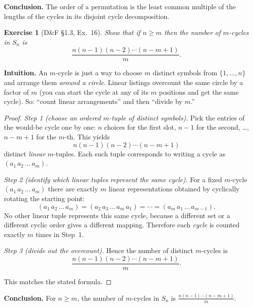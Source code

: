 \documentclass[12pt]{article}
\newtheorem{exercise}[theorem]{Exercise}
\theoremstyle{definition}
\begin{document}
\textbf{Conclusion.} The order of a permutation is the least common multiple of the lengths
of the cycles in its disjoint cycle decomposition. \qedhere


\newpage

\begin{exercise}[D\&F §1.3, Ex.~16]
Show that if $n\ge m$ then the number of $m$-cycles in $S_n$ is
\[
\frac{n(n-1)(n-2)\cdots(n-m+1)}{m}.
\]
\end{exercise}

\dotfill

\noindent\textbf{Intuition.}
An $m$-cycle is just a way to choose $m$ distinct symbols from $\{1,\dots,n\}$ and arrange them
\emph{around a circle}. Linear listings overcount the same circle by a factor of $m$ (you can start the cycle at any of its $m$ positions and get the same cycle). So: “count linear arrangements” and then “divide by $m$.”

\dotfill

\begin{proof}
\emph{Step 1 (choose an ordered $m$-tuple of distinct symbols).}
Pick the entries of the would-be cycle one by one: $n$ choices for the first slot, $n-1$ for the second, \dots, $n-m+1$ for the $m$-th.  
This yields
\[
n(n-1)(n-2)\cdots(n-m+1)
\]
distinct \emph{linear} $m$-tuples. Each such tuple corresponds to writing a cycle as $(a_1\,a_2\,\dots\,a_m)$.

\smallskip

\emph{Step 2 (identify which linear tuples represent the same cycle).}
For a fixed $m$-cycle $(a_1\,a_2\,\dots\,a_m)$ there are exactly $m$ linear representations obtained by cyclically rotating the starting point:
\[
(a_1\,a_2\,\dots\,a_m)=(a_2\,a_3\,\dots\,a_m\,a_1)=\cdots=(a_m\,a_1\,\dots\,a_{m-1}).
\]
No other linear tuple represents this same cycle, because a different set or a different cyclic order gives a different mapping. Therefore each \emph{cycle} is counted exactly $m$ times in Step~1.

\smallskip

\emph{Step 3 (divide out the overcount).}
Hence the number of distinct $m$-cycles is
\[
\frac{n(n-1)(n-2)\cdots(n-m+1)}{m}.
\]

This matches the stated formula.
\end{proof}

\textbf{Conclusion.} For $n\ge m$, the number of $m$-cycles in $S_n$ is $\displaystyle \frac{n(n-1)\cdots(n-m+1)}{m}$. \qedhere
\end{document}
